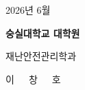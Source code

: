 \begin{center}
  {\fontsize{14}{20}\selectfont 2026년 6월}\par

  \vspace{2.0cm} %
  {\fontsize{16}{22}\selectfont\bfseries 숭실대학교 대학원}\par

  \vspace{1.0cm} %
  {\fontsize{14}{20}\selectfont 재난안전관리학과}\par

  \vspace{1.0cm} %
  {\fontsize{14}{20}\selectfont 이\ \ \ 창\ \ \ 호}\par

  \vspace*{1.5cm}
\end{center}

\endgroup

\clearpage
